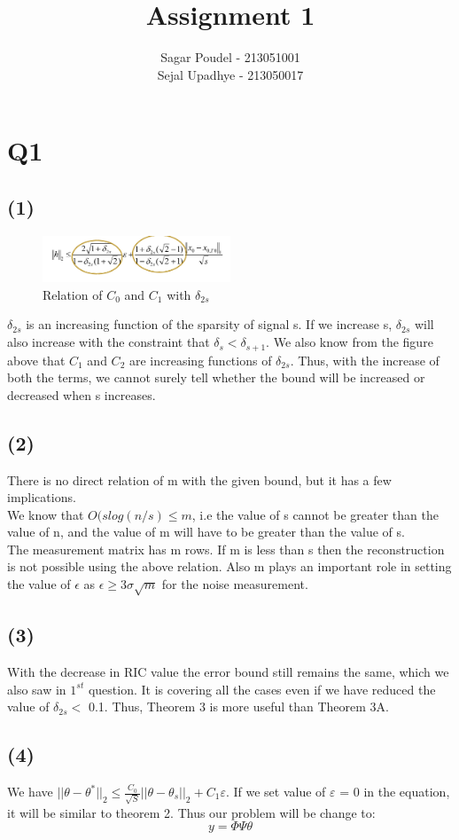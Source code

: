 \documentclass{article}
\title{Assignment 1}
\author{Sagar Poudel - 213051001 \\ Sejal Upadhye - 213050017}
\begin{document}
\maketitle


\section{Q1}
\subsection{(1)}
\begin{figure}[ht]
\centering
\includegraphics[width=0.5\textwidth]{c0c1.png}
\caption{Relation of $C_0$ and $C_1$ with $\delta_{2s}$}
\end{figure}
$\delta_{2s}$ is an increasing function of the sparsity of signal s. If we increase s, $\delta_{2s}$ will also increase with the constraint that $\delta_s < \delta_{s+1}$. We also know from the figure above that $C_1$ and $C_2$ are increasing functions of $\delta_{2s}$. Thus, with the increase of both the terms, we cannot surely tell whether the bound will be increased or decreased when s increases.
\subsection{(2)}
There is no direct relation of m with the given bound, but it has a few implications.\\
We know that $ O(slog(n/s) \leq m$, i.e the value of s cannot be greater than the value of n, and the value of m will have to be greater than the value of s.\\The measurement matrix has m rows. If m is less than s then the reconstruction is not possible using the above relation. Also m plays an important role in setting the value of $\epsilon$ as $\epsilon \ge 3\sigma\sqrt{m}$ for the noise measurement.
\subsection{(3)}
With the decrease in RIC value the error bound still remains the same, which we also saw in $1^{st}$ question. It is covering all the cases even if we have reduced the value of $\delta_{2s} < $ 0.1. Thus, Theorem 3 is more useful than Theorem 3A.
\subsection{(4)}
We have
$||\theta - \theta^{*}||_{2} \leq \frac{C_0}{\sqrt{S}}||\theta - \theta_{s}||_2 + C_{1} \varepsilon$.
If we set value of $\varepsilon$ = 0 in the equation, it will be similar to theorem 2. Thus our problem will be change to:
$$y = \Phi \Psi \theta$$
\end{document}
